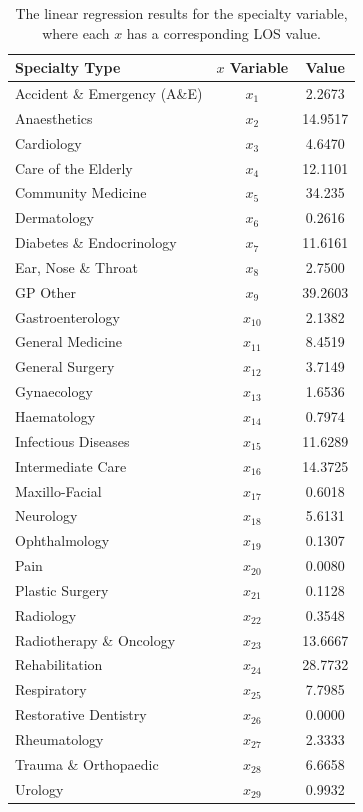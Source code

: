 \documentclass[../thesis.tex]{subfiles}
\begin{document}
\begin{table}[h!]
    \centering
    \begin{tabular}{lcc} \toprule
      Specialty Type   & $x$ Variable & Value \\ \midrule
      Accident \& Emergency (A\&E) & $x_{1}$ & 2.2673\\ 
      Anaesthetics & $x_{2}$ & 14.9517 \\
      Cardiology & $x_{3}$ & 4.6470\\
      Care of the Elderly & $x_{4}$ & 12.1101 \\
      Community Medicine & $x_{5}$ & 34.235\\
      Dermatology & $x_{6}$ & 0.2616\\
      Diabetes \& Endocrinology & $x_{7}$ & 11.6161\\
      Ear, Nose \& Throat & $x_{8}$ &2.7500 \\
      GP Other & $x_{9}$ & 39.2603\\
      Gastroenterology & $x_{10}$ &2.1382 \\
      General Medicine & $x_{11}$ & 8.4519\\
      General Surgery & $x_{12}$ & 3.7149\\
      Gynaecology & $x_{13}$ & 1.6536\\
      Haematology & $x_{14}$ & 0.7974\\
      Infectious Diseases & $x_{15}$ &11.6289 \\
      Intermediate Care & $x_{16}$ &14.3725 \\
      Maxillo-Facial & $x_{17}$ & 0.6018\\
      Neurology & $x_{18}$ & 5.6131 \\
      Ophthalmology & $x_{19}$ &0.1307 \\
      Pain & $x_{20}$ & 0.0080\\
      Plastic Surgery & $x_{21}$ & 0.1128\\
      Radiology & $x_{22}$ & 0.3548\\
      Radiotherapy \& Oncology & $x_{23}$ & 13.6667\\
      Rehabilitation & $x_{24}$ & 28.7732\\
      Respiratory & $x_{25}$ & 7.7985\\
      Restorative Dentistry & $x_{26}$ & 0.0000\\
      Rheumatology & $x_{27}$ & 2.3333\\
      Trauma \& Orthopaedic & $x_{28}$ & 6.6658\\
      Urology & $x_{29}$ &0.9932 \\\bottomrule
    \end{tabular}
    \caption{The linear regression results for the specialty variable, where each $x$ has a corresponding LOS value.}
    \label{tab:linreg-specialty}
\end{table}
\end{document}
